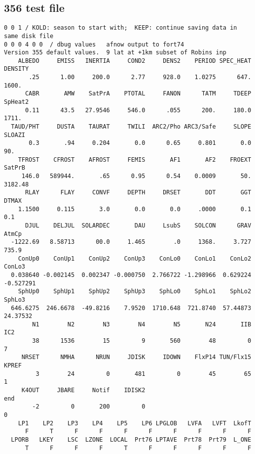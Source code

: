 \documentclass{article}
\begin{document}
\subsection{356 test file \label{apJ}} %
\vspace{-3.mm} 
\begin{verbatim}
0 0 1 / KOLD: season to start with;  KEEP: continue saving data in same disk file
0 0 0 4 0 0  / dbug values   afnow output to fort74
Version 355 default values.  9 lat at +1km subset of Robins inp
    ALBEDO     EMISS   INERTIA     COND2     DENS2    PERIOD SPEC_HEAT   DENSITY
       .25      1.00     200.0      2.77     928.0    1.0275      647.     1600.
      CABR       AMW    SatPrA    PTOTAL     FANON      TATM     TDEEP   SpHeat2
      0.11      43.5   27.9546     546.0      .055      200.     180.0     1711.
  TAUD/PHT     DUSTA    TAURAT     TWILI  ARC2/Pho ARC3/Safe     SLOPE    SLOAZI
       0.3       .94     0.204       0.0      0.65     0.801       0.0       90.
    TFROST    CFROST    AFROST     FEMIS       AF1       AF2    FROEXT    SatPrB
     146.0   589944.       .65      0.95      0.54    0.0009       50.   3182.48
      RLAY      FLAY     CONVF     DEPTH     DRSET       DDT       GGT     DTMAX
    1.1500     0.115       3.0       0.0       0.0     .0000       0.1       0.1
      DJUL    DELJUL  SOLARDEC       DAU     LsubS    SOLCON      GRAV     AtmCp
  -1222.69   8.58713      00.0     1.465        .0     1368.     3.727     735.9
    ConUp0    ConUp1    ConUp2    ConUp3    ConLo0    ConLo1    ConLo2    ConLo3
  0.038640 -0.002145  0.002347 -0.000750  2.766722 -1.298966  0.629224 -0.527291
    SphUp0    SphUp1    SphUp2    SphUp3    SphLo0    SphLo1    SphLo2    SphLo3
  646.6275  246.6678  -49.8216    7.9520  1710.648  721.8740  57.44873  24.37532
        N1        N2        N3        N4        N5       N24       IIB       IC2
        38      1536        15         9       560        48         0         7
     NRSET      NMHA      NRUN     JDISK     IDOWN    FlxP14 TUN/Flx15     KPREF
         3        24         0       481         0        45        65         1
     K4OUT     JBARE     Notif    IDISK2                                     end
        -2         0       200         0                                       0
    LP1    LP2    LP3    LP4    LP5    LP6 LPGLOB   LVFA   LVFT  LkofT          
      F      T      F      F      F      F      F      F      F      F          
  LPORB   LKEY    LSC  LZONE  LOCAL  Prt76 LPTAVE  Prt78  Prt79  L_ONE          
      T      F      F      F      T      F      F      F      F      F          

\end{verbatim}
\end{document}
